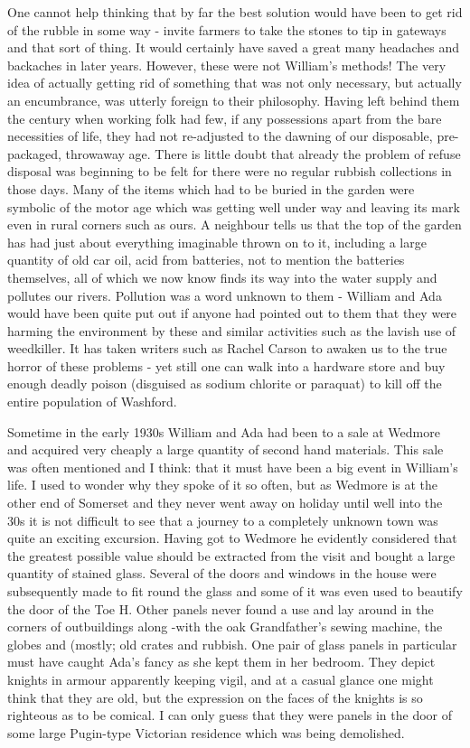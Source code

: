 One cannot help thinking that by far the best solution would have been to get rid of the rubble in some way - invite farmers to take the stones to tip in gateways and that sort of thing. It would certainly have saved a great many headaches and backaches in later years. However, these were not William's methods! The very idea of actually getting rid of something that was not only necessary, but actually an encumbrance, was utterly foreign to their philosophy. Having left behind them the century when working folk had few, if any possessions apart from the bare necessities of life, they had not re-adjusted to the dawning of our disposable, pre-packaged, throwaway age. There is little doubt that already the problem of refuse disposal was beginning to be felt for there were no regular rubbish collections in those days. Many of the items which had to be buried in the garden were symbolic of the motor age which was getting well under way and leaving its mark even in rural corners such as ours. A neighbour tells us that the top of the garden has had just about everything imaginable thrown on to it, including a large quantity of old car oil, acid from batteries, not to mention the batteries themselves, all of which we now know finds its way into the water supply and pollutes our rivers. Pollution was a word unknown to them - William and Ada would have been quite put out if anyone had pointed out to them that they were harming the environment by these and similar activities such as the lavish use of weedkiller. It has taken writers such as Rachel Carson to awaken us to the true horror of these problems - yet still one can walk into a hardware store and buy enough deadly poison (disguised as sodium chlorite or paraquat) to kill off the entire population of Washford.

Sometime in the early 1930s William and Ada had been to a sale at Wedmore and acquired very cheaply a large quantity of second hand materials. This sale was often mentioned and I think: that it must have been a big event in William's life. I used to wonder why they spoke of it so often, but as Wedmore is at the other end of Somerset and they never went away on holiday until well into the 30s it is not difficult to see that a journey to a completely unknown town was quite an exciting excursion. Having got to Wedmore he evidently considered that the greatest possible value should be extracted from the visit and bought a large quantity of stained glass. Several of the doors and windows in the house were subsequently made to fit round the glass and some of it was even used to beautify the door of the Toe H. Other panels never found a use and lay around in the corners of outbuildings along -with the oak Grandfather’s sewing machine, the globes and (mostly; old crates and rubbish. One pair of glass panels in particular must have caught Ada's fancy as she kept them in her bedroom. They depict knights in armour apparently keeping vigil, and at a casual glance one might think that they are old, but the expression on the faces of the knights is so righteous as to be comical. I can only guess that they were panels in the door of some large Pugin-type Victorian residence which was being demolished.

